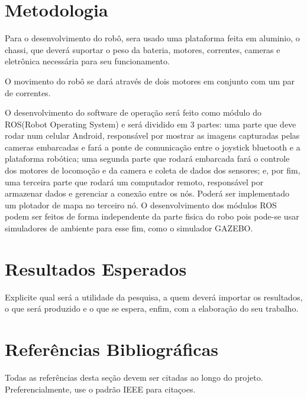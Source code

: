 \documentclass[a4paper,12pt]{article}
\begin{document}
\section{Metodologia}
	Para o desenvolvimento do robô, sera usado uma plataforma feita em aluminio, o chassi, que deverá suportar o peso da bateria, motores, correntes, cameras e eletrônica necessária para seu funcionamento.\par
	O movimento do robô se dará através de dois motores em conjunto com um par de correntes.\par
	O desenvolvimento do software de operação será feito como módulo do ROS(Robot Operating System) e será dividido em 3 partes: uma parte que deve rodar num celular Android, responsável por mostrar as imagens capturadas pelas cameras embarcadas e fará a ponte de comunicação entre o joystick bluetooth e a plataforma robótica; uma segunda parte que rodará embarcada fará o controle dos motores de locomoção e da camera e coleta de dados dos sensores; e, por fim, uma terceira parte que rodará um computador remoto, responsável por armazenar dados e gerenciar a conexão entre os nós. Poderá ser implementado um plotador de mapa no terceiro nó. O desenvolvimento dos módulos ROS podem ser feitos de forma independente da parte fisica do robo pois pode-se usar simuladores de ambiente para esse fim, como o simulador GAZEBO.



\section{Resultados Esperados}
Explicite qual será a utilidade da pesquisa, a quem deverá importar os resultados, o que será produzido e o que se espera, enfim, com a elaboração do seu trabalho. 


\section*{Referências Bibliográficas}
Todas as referências desta seção devem ser citadas ao longo do projeto. Preferencialmente, use o padrão IEEE para citaçoes.




\end{document}
